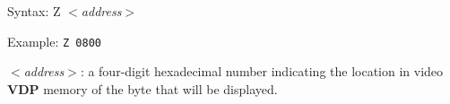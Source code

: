         Syntax: Z \textit{$<$address$>$}

        Example: \texttt{Z 0800}

        \hspace{1cm}\textit{$<$address$>$}: a four-digit hexadecimal number
        indicating the location in video \textbf{VDP} memory of the byte that
        will be displayed.






